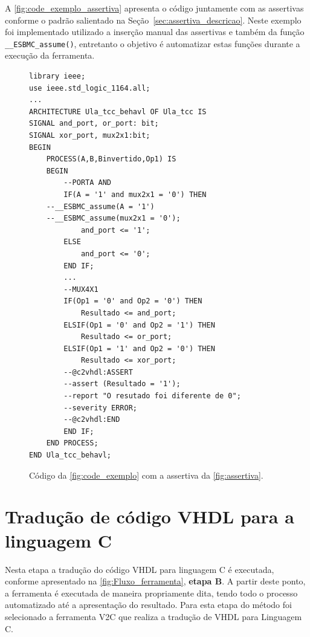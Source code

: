 \par
A \autoref{fig:code_exemplo_assertiva} apresenta o código juntamente com as assertivas conforme o padrão salientado na Seção~\ref{sec:assertiva_descricao}. Neste exemplo foi implementado utilizado a inserção manual das assertivas e também da função \texttt{\_\_ESBMC\_assume()}, entretanto o objetivo é automatizar estas funções durante a execução da ferramenta.

\begin{figure}[H]
\caption{\label{fig:code_exemplo_assertiva} Código da \autoref{fig:code_exemplo} com a assertiva da \autoref{fig:assertiva}.}
	\begin{center}
    \begin{minipage}{0.99\textwidth}
    \begin{lstlisting}       
library ieee;
use ieee.std_logic_1164.all;
...
ARCHITECTURE Ula_tcc_behavl OF Ula_tcc IS
SIGNAL and_port, or_port: bit;
SIGNAL xor_port, mux2x1:bit;
BEGIN
	PROCESS(A,B,Binvertido,Op1) IS
	BEGIN
		--PORTA AND
		IF(A = '1' and mux2x1 = '0') THEN
    --__ESBMC_assume(A = '1')
    --__ESBMC_assume(mux2x1 = '0');
		    and_port <= '1';
		ELSE
		    and_port <= '0';
		END IF;
		...
		--MUX4X1
		IF(Op1 = '0' and Op2 = '0') THEN
			Resultado <= and_port;
		ELSIF(Op1 = '0' and Op2 = '1') THEN
			Resultado <= or_port;
		ELSIF(Op1 = '1' and Op2 = '0') THEN
			Resultado <= xor_port;
        --@c2vhdl:ASSERT
        --assert (Resultado = '1');
        --report "O resutado foi diferente de 0";
        --severity ERROR;
        --@c2vhdl:END
		END IF;
	END PROCESS;
END Ula_tcc_behavl;
    \end{lstlisting}
    \end{minipage}
	\end{center}
\end{figure}
\section{\label{cap:traducao}Tradução de código VHDL para a linguagem C}

\par
Nesta etapa a tradução do código VHDL para linguagem C é executada, conforme apresentado na \autoref{fig:Fluxo_ferramenta}, \textbf{etapa B}. A partir deste ponto, a ferramenta é executada de maneira propriamente dita, tendo todo o processo automatizado até a apresentação do resultado. Para esta etapa do método foi selecionado a ferramenta V2C\cite{albertoV2C} que realiza a tradução de VHDL para Linguagem C.

